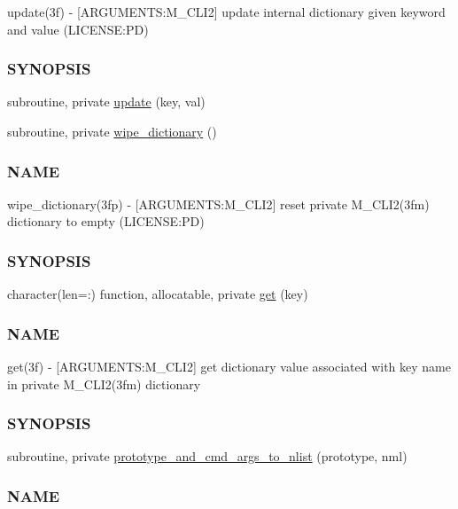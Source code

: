 \begin{DoxyCompactItemize}
\begin{DoxyCompactList}
update(3f) -\/ \mbox{[}A\+R\+G\+U\+M\+E\+N\+TS\+:M\+\_\+\+C\+L\+I2\mbox{]} update internal dictionary given keyword and value (L\+I\+C\+E\+N\+SE\+:PD) \subsubsection*{S\+Y\+N\+O\+P\+S\+IS}\end{DoxyCompactList}\item 
subroutine, private \mbox{\hyperlink{namespacem__cli2_a160d56bc4a10faef7e8a8a4f04f4dadb}{update}} (key, val)
\item 
subroutine, private \mbox{\hyperlink{namespacem__cli2_ab1525b0419475486f520ef502daa5e94}{wipe\+\_\+dictionary}} ()
\begin{DoxyCompactList}\small\item\em \subsubsection*{N\+A\+ME}

wipe\+\_\+dictionary(3fp) -\/ \mbox{[}A\+R\+G\+U\+M\+E\+N\+TS\+:M\+\_\+\+C\+L\+I2\mbox{]} reset private M\+\_\+\+C\+L\+I2(3fm) dictionary to empty (L\+I\+C\+E\+N\+SE\+:PD) \subsubsection*{S\+Y\+N\+O\+P\+S\+IS}\end{DoxyCompactList}\item 
character(len=\+:) function, allocatable, private \mbox{\hyperlink{namespacem__cli2_aa92e8ad0300d4e324e29eae1ab9d04b4}{get}} (key)
\begin{DoxyCompactList}\small\item\em \subsubsection*{N\+A\+ME}

get(3f) -\/ \mbox{[}A\+R\+G\+U\+M\+E\+N\+TS\+:M\+\_\+\+C\+L\+I2\mbox{]} get dictionary value associated with key name in private M\+\_\+\+C\+L\+I2(3fm) dictionary \subsubsection*{S\+Y\+N\+O\+P\+S\+IS}\end{DoxyCompactList}\item 
subroutine, private \mbox{\hyperlink{namespacem__cli2_a46f31858773ff1b4cf96329a14130bf2}{prototype\+\_\+and\+\_\+cmd\+\_\+args\+\_\+to\+\_\+nlist}} (prototype, nml)
\begin{DoxyCompactList}\small\item\em \subsubsection*{N\+A\+ME}


\end{DoxyCompactList}
\end{DoxyCompactItemize}
